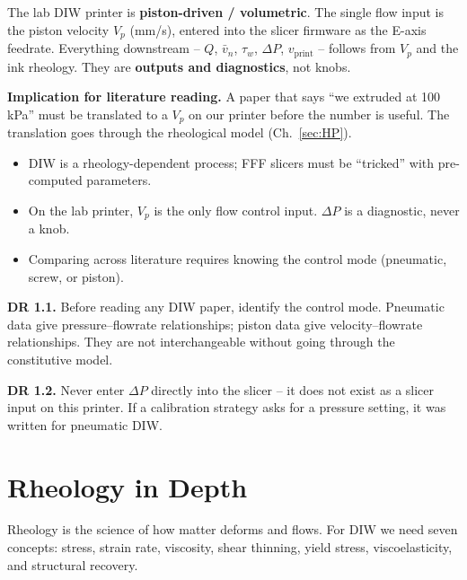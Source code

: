 \documentclass[11pt,a4paper]{article}
\begin{document}
\begin{controlbox}
The lab DIW printer is \textbf{piston-driven / volumetric}. The single
flow input is the piston velocity $V_p$ (\si{\mm/\s}), entered into
the slicer firmware as the E-axis feedrate. Everything downstream --
$Q$, $\bar v_n$, $\tau_w$, $\Delta P$, $v_\mathrm{print}$ -- follows
from $V_p$ and the ink rheology. They are \textbf{outputs and
diagnostics}, not knobs.

\medskip
\textbf{Implication for literature reading.} A paper that says ``we
extruded at 100\,kPa'' must be translated to a $V_p$ on our printer
before the number is useful. The translation goes through the rheological
model (Ch.~\ref{sec:HP}).
\end{controlbox}

\begin{takeawaybox}
\begin{itemize}[leftmargin=1.4em,itemsep=2pt]
\item DIW is a rheology-dependent process; FFF slicers must be ``tricked''
  with pre-computed parameters.
\item On the lab printer, $V_p$ is the only flow control input.
  $\Delta P$ is a diagnostic, never a knob.
\item Comparing across literature requires knowing the control mode
  (pneumatic, screw, or piston).
\end{itemize}
\end{takeawaybox}

\begin{designrulebox}
\textbf{DR 1.1.} Before reading any DIW paper, identify the control
mode. Pneumatic data give pressure--flowrate relationships; piston data
give velocity--flowrate relationships. They are not interchangeable
without going through the constitutive model.

\textbf{DR 1.2.} Never enter $\Delta P$ directly into the slicer -- it
does not exist as a slicer input on this printer. If a calibration
strategy asks for a pressure setting, it was written for pneumatic DIW.
\end{designrulebox}

\section{Rheology in Depth}
\label{sec:rheo_primer}

Rheology is the science of how matter deforms and flows. For DIW we need
seven concepts: stress, strain rate, viscosity, shear thinning, yield
stress, viscoelasticity, and structural recovery.
\end{document}
